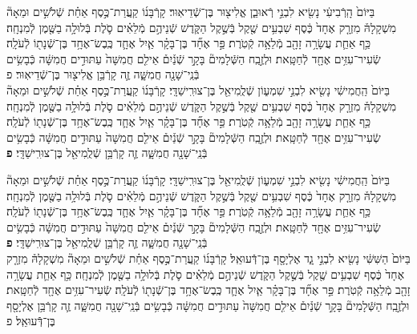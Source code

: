 \documentclass[twoside, openany, parskip=half, 11pt]{book}
\begin{document}
\begin{sometimes}
\begin{footnotesize}
\begin{multicols}{2}

בַּיּוֹם֙ הָֽרְֿבִיעִ֔י נָשִׂ֖יא לִבְנֵ֣י רְֿאוּבֵ֑ן אֱלִיצ֖וּר בֶּן־שְֿׁדֵיאֽוּר׃ קָרְֿבָּנ֜וֹ קַֽעֲרַת־כֶּ֣סֶף אַחַ֗ת שְֿׁלֹשִׁ֣ים וּמֵאָה֘ מִשְׁקָלָהּ֒ מִזְרָ֤ק אֶחָד֙ כֶּ֔סֶף שִׁבְעִ֥ים שֶׁ֖קֶל בְּֿשֶׁ֣קֶל הַקֹּ֑דֶשׁ שְֿׁנֵיהֶ֣ם מְֿלֵאִ֗ים סֹ֛לֶת בְּֿלוּלָ֥ה בַשֶּׁ֖מֶן לְֿמִנְחָֽה׃ כַּ֥ף אַחַ֛ת עֲשָׂרָ֥ה זָהָ֖ב מְֿלֵאָ֥ה קְֿטֹֽרֶת׃  פַּ֣ר אֶחָ֞ד בֶּן־בָּקָ֗ר אַ֧יִל אֶחָ֛ד כֶּֽבֶשׂ־אֶחָ֥ד בֶּן־שְֿׁנָת֖וֹ לְֿעֹלָֽה׃ שְֿׂעִיר־עִזִּ֥ים אֶחָ֖ד לְֿחַטָּֽאת׃ וּלְזֶ֣בַֽח הַשְּֿׁלָמִים֘ בָּקָ֣ר שְֿׁנַ֒יִם֒ אֵילִ֤ם חֲמִשָּׁה֙ עַתּוּדִ֣ים חֲמִשָּׁ֔ה כְּֿבָשִׂ֥ים בְּֿנֵֽי־שָׁנָ֖ה חֲמִשָּׁ֑ה זֶ֛ה קָרְֿבַּ֥ן אֱלִיצ֖וּר בֶּן־שְֿׁדֵיאֽוּר׃ פ\\
 בַּיּוֹם֙ הַֽחֲמִישִׁ֔י נָשִׂ֖יא לִבְנֵ֣י שִׁמְע֑וֹן שְֿׁלֻֽמִיאֵ֖ל בֶּן־צוּרִֽישַׁדָּֽי׃ קָרְֿבָּנ֜וֹ קַֽעֲרַת־כֶּ֣סֶף אַחַ֗ת שְֿׁלֹשִׁ֣ים וּמֵאָה֘ מִשְׁקָלָהּ֒ מִזְרָ֤ק אֶחָד֙ כֶּ֔סֶף שִׁבְעִ֥ים שֶׁ֖קֶל בְּֿשֶׁ֣קֶל הַקֹּ֑דֶשׁ שְֿׁנֵיהֶ֣ם מְֿלֵאִ֗ים סֹ֛לֶת בְּֿלוּלָ֥ה בַשֶּׁ֖מֶן לְֿמִנְחָֽה׃ כַּ֥ף אַחַ֛ת עֲשָׂרָ֥ה זָהָ֖ב מְֿלֵאָ֥ה קְֿטֹֽרֶת׃ פַּ֣ר אֶחָ֞ד בֶּן־בָּקָ֗ר אַ֧יִל אֶחָ֛ד כֶּֽבֶשׂ־אֶחָ֥ד בֶּן־שְֿׁנָת֖וֹ לְֿעֹלָֽה׃ שְֿׂעִיר־עִזִּ֥ים אֶחָ֖ד לְֿחַטָּֽאת׃ וּלְזֶ֣בַֽח הַשְּֿׁלָמִים֘ בָּקָ֣ר שְֿׁנַ֒יִם֒ אֵילִ֤ם חֲמִשָּׁה֙ עַתּוּדִ֣ים חֲמִשָּׁ֔ה כְּֿבָשִׂ֥ים בְּֿנֵֽי־שָׁנָ֖ה חֲמִשָּׁ֑ה זֶ֛ה קָרְֿבַּ֥ן שְֿׁלֻֽמִיאֵ֖ל בֶּן־צוּרִֽישַׁדָּֽי׃ \textbf{פ}

\vfill\null
\columnbreak


בַּיּוֹם֙ הַֽחֲמִישִׁ֔י נָשִׂ֖יא לִבְנֵ֣י שִׁמְע֑וֹן שְֿׁלֻֽמִיאֵ֖ל בֶּן־צוּרִֽישַׁדָּֽי׃ קָרְֿבָּנ֜וֹ קַֽעֲרַת־כֶּ֣סֶף אַחַ֗ת שְֿׁלֹשִׁ֣ים וּמֵאָה֘ מִשְׁקָלָהּ֒ מִזְרָ֤ק אֶחָד֙ כֶּ֔סֶף שִׁבְעִ֥ים שֶׁ֖קֶל בְּֿשֶׁ֣קֶל הַקֹּ֑דֶשׁ שְֿׁנֵיהֶ֣ם מְֿלֵאִ֗ים סֹ֛לֶת בְּֿלוּלָ֥ה בַשֶּׁ֖מֶן לְֿמִנְחָֽה׃ כַּ֥ף אַחַ֛ת עֲשָׂרָ֥ה זָהָ֖ב מְֿלֵאָ֥ה קְֿטֹֽרֶת׃  פַּ֣ר אֶחָ֞ד בֶּן־בָּקָ֗ר אַ֧יִל אֶחָ֛ד כֶּֽבֶשׂ־אֶחָ֥ד בֶּן־שְֿׁנָת֖וֹ לְֿעֹלָֽה׃ שְֿׂעִיר־עִזִּ֥ים אֶחָ֖ד לְֿחַטָּֽאת׃ וּלְזֶ֣בַֽח הַשְּֿׁלָמִים֘ בָּקָ֣ר שְֿׁנַ֒יִם֒ אֵילִ֤ם חֲמִשָּׁה֙ עַתּוּדִ֣ים חֲמִשָּׁ֔ה כְּֿבָשִׂ֥ים בְּֿנֵֽי־שָׁנָ֖ה חֲמִשָּׁ֑ה זֶ֛ה קָרְֿבַּ֥ן שְֿׁלֻֽמִיאֵ֖ל בֶּן־צוּרִֽישַׁדָּֽי׃ \textbf{פ} \\
 בַּיּוֹם֙ הַשִּׁשִּׁ֔י נָשִׂ֖יא לִבְנֵ֣י גָ֑ד אֶלְיָסָ֖ף בֶּן־דְּֿֿעוּאֵֽל׃ קָרְֿבָּנ֜וֹ קַֽעֲרַת־כֶּ֣סֶף אַחַ֗ת שְֿׁלֹשִׁ֣ים וּמֵאָה֘ מִשְׁקָלָהּ֒ מִזְרָ֤ק אֶחָד֙ כֶּ֔סֶף שִׁבְעִ֥ים שֶׁ֖קֶל בְּֿשֶׁ֣קֶל הַקֹּ֑דֶשׁ שְֿׁנֵיהֶ֣ם מְֿלֵאִ֗ים סֹ֛לֶת בְּֿלוּלָ֥ה בַשֶּׁ֖מֶן לְֿמִנְחָֽה׃ כַּ֥ף אַחַ֛ת עֲשָׂרָ֥ה זָהָ֖ב מְֿלֵאָ֥ה קְֿטֹֽרֶת׃ פַּ֣ר אֶחָ֞ד בֶּן־בָּקָ֗ר אַ֧יִל אֶחָ֛ד כֶּֽבֶשׂ־אֶחָ֥ד בֶּן־שְֿׁנָת֖וֹ לְֿעֹלָֽה׃ שְֿׂעִיר־עִזִּ֥ים אֶחָ֖ד לְֿחַטָּֽאת׃ וּלְזֶ֣בַֽח הַשְּֿׁלָמִים֘ בָּקָ֣ר שְֿׁנַ֒יִם֒ אֵילִ֤ם חֲמִשָּׁה֙ עַתּוּדִ֣ים חֲמִשָּׁ֔ה כְּֿבָשִׂ֥ים בְּֿנֵֽי־שָׁנָ֖ה חֲמִשָּׁ֑ה זֶ֛ה קָרְֿבַּ֥ן אֶלְיָסָ֖ף בֶּן־דְּֿֿעוּאֵֽל׃ פ


\end{multicols}
\end{footnotesize}
\end{sometimes}
\end{document}

